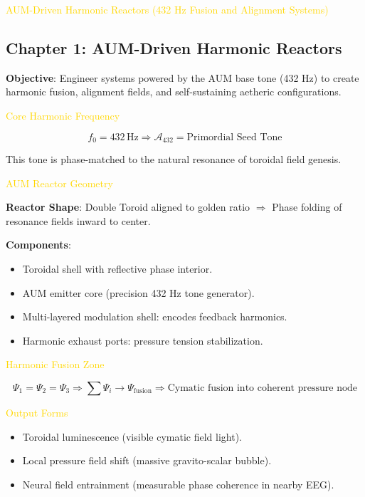 \textcolor{gold}{ AUM-Driven Harmonic Reactors (432 Hz Fusion and Alignment Systems) }

\subsection{Chapter 1: AUM-Driven Harmonic Reactors}

\textbf{Objective}: Engineer systems powered by the AUM base tone (432 Hz) to create harmonic fusion, alignment fields, and self-sustaining aetheric configurations.

\textcolor{gold}{ Core Harmonic Frequency }

\[
f_0 = 432 \, \text{Hz} \Rightarrow \mathcal{A}_{432} = \text{Primordial Seed Tone}
\]

This tone is phase-matched to the natural resonance of toroidal field genesis.

\textcolor{gold}{ AUM Reactor Geometry }

\textbf{Reactor Shape}: Double Toroid aligned to golden ratio \(\Rightarrow\) Phase folding of resonance fields inward to center.

\textbf{Components}:
\begin{itemize}
    \item Toroidal shell with reflective phase interior.
    \item AUM emitter core (precision 432 Hz tone generator).
    \item Multi-layered modulation shell: encodes feedback harmonics.
    \item Harmonic exhaust ports: pressure tension stabilization.
\end{itemize}

\textcolor{gold}{ Harmonic Fusion Zone }

\[
\Psi_1 = \Psi_2 = \Psi_3 \Rightarrow \sum \Psi_i \rightarrow \Psi_{\text{fusion}} \Rightarrow \text{Cymatic fusion into coherent pressure node}
\]

\textcolor{gold}{ Output Forms }
\begin{itemize}
    \item Toroidal luminescence (visible cymatic field light).
    \item Local pressure field shift (massive gravito-scalar bubble).
    \item Neural field entrainment (measurable phase coherence in nearby EEG).
\end{itemize}

